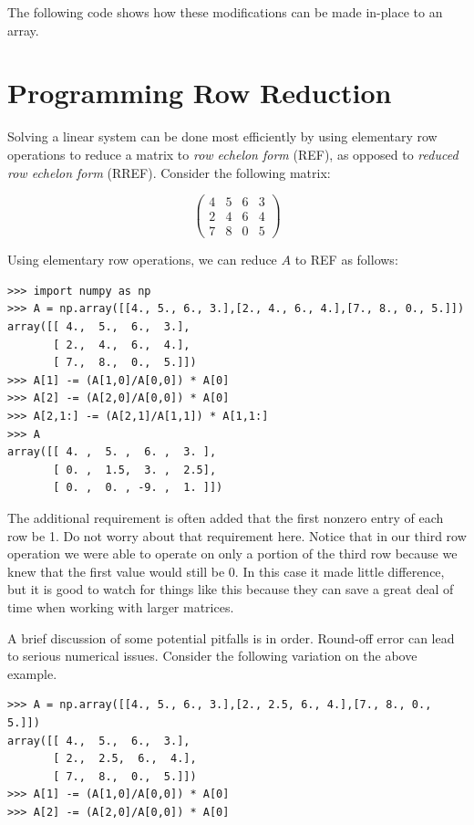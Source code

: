 The following code shows how these modifications can be made in-place to an array.


\section*{Programming Row Reduction}
Solving a linear system can be done most efficiently by using elementary row operations to reduce a matrix to \emph{row echelon form} (REF), as opposed to \emph{reduced row echelon form} (RREF).
Consider the following matrix:

\[
\begin{pmatrix}
4&5&6&3 \\
2&4&6&4 \\
7&8&0&5
\end{pmatrix}
\]

Using elementary row operations, we can reduce $A$ to REF as follows:

\begin{lstlisting}
>>> import numpy as np
>>> A = np.array([[4., 5., 6., 3.],[2., 4., 6., 4.],[7., 8., 0., 5.]])
array([[ 4.,  5.,  6.,  3.],
       [ 2.,  4.,  6.,  4.],
       [ 7.,  8.,  0.,  5.]])
>>> A[1] -= (A[1,0]/A[0,0]) * A[0]
>>> A[2] -= (A[2,0]/A[0,0]) * A[0]
>>> A[2,1:] -= (A[2,1]/A[1,1]) * A[1,1:]
>>> A
array([[ 4. ,  5. ,  6. ,  3. ],
       [ 0. ,  1.5,  3. ,  2.5],
       [ 0. ,  0. , -9. ,  1. ]])
\end{lstlisting}

The additional requirement is often added that the first nonzero entry of each row be 1. Do not worry about that requirement here.
Notice that in our third row operation we were able to operate on only a portion of the third row because we knew that the first value would still be 0. In this case it made little difference, but it is good to watch for things like this because they can save a great deal of time when working with larger matrices.

A brief discussion of some potential pitfalls is in order.
Round-off error can lead to serious numerical issues. Consider the
following variation on the above example.

\begin{lstlisting}
>>> A = np.array([[4., 5., 6., 3.],[2., 2.5, 6., 4.],[7., 8., 0., 5.]])
array([[ 4.,  5.,  6.,  3.],
       [ 2.,  2.5,  6.,  4.],
       [ 7.,  8.,  0.,  5.]])
>>> A[1] -= (A[1,0]/A[0,0]) * A[0]
>>> A[2] -= (A[2,0]/A[0,0]) * A[0]
\end{lstlisting}

